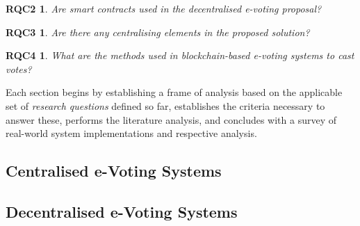 \documentclass{ieeeaccess}
\newtheorem*{rqc2}{RQC2}
\newtheorem*{rqc3}{RQC3}
\newtheorem*{rqc4}{RQC4}
\begin{document}
    \begin{rqc2}
        Are smart contracts used in the decentralised e-voting proposal?
    \end{rqc2}

    \begin{rqc3}
        Are there any centralising elements in the proposed solution?
    \end{rqc3}

    \begin{rqc4}
        What are the methods used in blockchain-based e-voting systems to cast votes?
    \end{rqc4}

Each section begins by establishing a frame of analysis based on the applicable set of \textit{research questions} defined so far, establishes the criteria necessary to answer these, performs the literature analysis, and concludes with a survey of real-world system implementations and respective analysis.

    \subsection{Centralised e-Voting Systems}
        \label{centralized_solutions}
        

    \subsection{Decentralised e-Voting Systems}
        \label{decentralized_solutions}
        

\twocolumn
\end{document}
